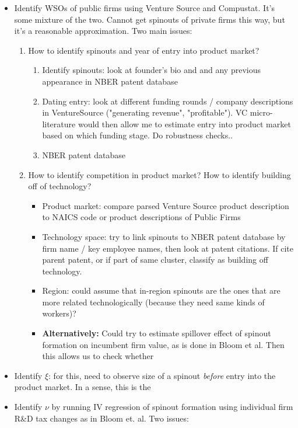 \documentclass[12pt,english]{article}
\theoremstyle{remark}
\begin{document}
\begin{itemize}
	\item Identify WSOs of public firms using Venture Source and Compustat. It's some mixture of the two. Cannot get spinouts of private firms this way, but it's a reasonable approximation. Two main issues:
	\begin{enumerate}
		\item How to identify spinouts and year of entry into product market?
		\begin{enumerate}
			\item Identify spinouts: look at founder's bio and and any previous appearance in NBER patent database
			\item Dating entry: look at different funding rounds / company descriptions in VentureSource ("generating revenue", "profitable"). VC micro-literature would then allow me to estimate entry into product market based on which funding stage. Do robustness checks..
			\item NBER patent database
		\end{enumerate}
		\item How to identify competition in product market? How to identify building off of technology?
		\begin{itemize}
			\item Product market: compare parsed Venture Source product description to NAICS code or product descriptions of Public Firms 
			\item Technology space: try to link spinouts to NBER patent database by firm name / key employee names, then look at patent citations. If cite parent patent, or if part of same cluster, classify as building off technology.
			\item Region: could assume that in-region spinouts are the ones that are more related technologically (because they need same kinds of workers)?
			\item \textbf{Alternatively:} Could try to estimate spillover effect of spinout formation on incumbent firm value, as is done in Bloom et al. Then this allows us to check whether 
		\end{itemize}
	\end{enumerate}
	\item Identify $\xi$: for this, need to observe size of a spinout \textit{before} entry into the product market. In a sense, this is the 
	\item Identify $\nu$ by running IV regression of spinout formation using individual firm R\&D tax changes as in Bloom et. al. Two issues:

\end{itemize}
\end{document}
